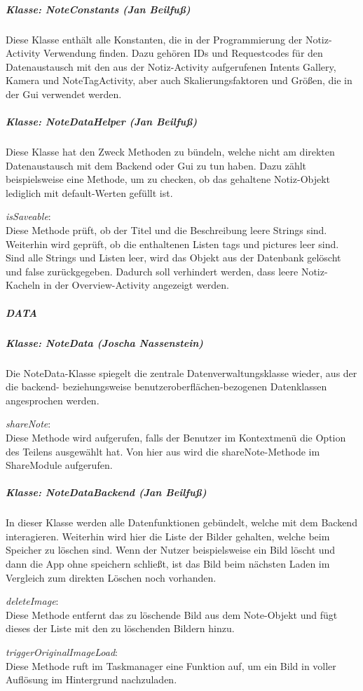 \subparagraph{Klasse: NoteConstants (Jan Beilfuß)}
Diese Klasse enthält alle Konstanten, die in der Programmierung der Notiz-Activity Verwendung finden. Dazu gehören IDs und Requestcodes für den Datenaustausch mit den aus der Notiz-Activity aufgerufenen Intents Gallery, Kamera und NoteTagActivity, aber auch Skalierungsfaktoren und Größen, die in der Gui verwendet werden.

\subparagraph{Klasse: NoteDataHelper (Jan Beilfuß)}
Diese Klasse hat den Zweck Methoden zu bündeln, welche nicht am direkten Datenaustausch mit dem Backend oder Gui zu tun haben. Dazu zählt beispielsweise eine Methode, um zu checken, ob das gehaltene Notiz-Objekt lediglich mit default-Werten gefüllt ist.

\textit{isSaveable}:\\
 Diese Methode prüft, ob der Titel und die Beschreibung leere Strings sind. Weiterhin wird geprüft, ob die enthaltenen Listen tags und pictures leer sind. Sind alle Strings und Listen leer, wird das Objekt aus der Datenbank gelöscht und false zurückgegeben. Dadurch soll verhindert werden, dass leere Notiz-Kacheln in der Overview-Activity angezeigt werden.

\subparagraph{DATA}
\subparagraph*{Klasse: NoteData (Joscha Nassenstein)}
Die NoteData-Klasse spiegelt die zentrale Datenverwaltungsklasse wieder, aus der die backend- beziehungsweise benutzeroberflächen-bezogenen Datenklassen angesprochen werden.

\textit{shareNote}:\\
Diese Methode wird aufgerufen, falls der Benutzer im Kontextmenü die Option des Teilens ausgewählt hat. Von hier aus wird die shareNote-Methode im ShareModule aufgerufen.

\subparagraph*{Klasse: NoteDataBackend (Jan Beilfuß)}
In dieser Klasse werden alle Datenfunktionen gebündelt, welche mit dem Backend interagieren. Weiterhin wird hier die Liste der Bilder gehalten, welche beim Speicher zu löschen sind. Wenn der Nutzer beispielsweise ein Bild löscht und dann die App ohne speichern schließt, ist das Bild beim nächsten Laden im Vergleich zum direkten Löschen noch vorhanden.

\textit{deleteImage}:\\
Diese Methode entfernt das zu löschende Bild aus dem Note-Objekt und fügt dieses der Liste mit den zu löschenden Bildern hinzu.

\textit{triggerOriginalImageLoad}:\\
Diese Methode ruft im Taskmanager eine Funktion auf, um ein Bild in voller Auflösung im Hintergrund nachzuladen.

